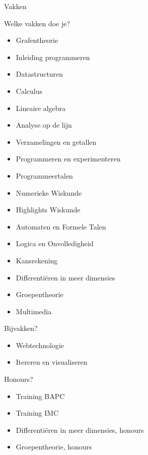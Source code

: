 \documentclass{beamer}
\begin{document}
\begin{frame}{Vakken}
    \begin{multicols}{2}
        Welke vakken doe je?
        \pause
        \begin{itemize}
            \item Grafentheorie
                  \pause
            \item Inleiding programmeren
                  \pause
            \item Datastructuren
                  \pause
            \item Calculus
                  \pause
            \item Lineaire algebra
                  \pause
            \item Analyse op de lijn
                  \pause
            \item Verzamelingen en getallen
                  \pause
            \item Programmeren en experimenteren
                  \pause
            \item Programmeertalen
                  \pause
            \item Numerieke Wiskunde
                  \pause
            \item Highlights Wiskunde
                  \pause
            \item Automaten en Formele Talen
                  \pause
            \item Logica en Onvolledigheid
                  \pause
            \item Kansrekening
                  \pause
            \item Differentiëren in meer dimensies
                  \pause
            \item Groepentheorie
                  \pause
            \item Multimedia
        \end{itemize}
        \pause
        Bijvakken?
        \pause
        \begin{itemize}
            \item Webtechnologie
                  \pause
            \item Itereren en visualiseren
        \end{itemize}
        \pause
        Honours?
        \begin{itemize}
            \pause
            \item Training BAPC
                  \pause
            \item Training IMC
                  \pause
            \item Differentiëren in meer dimensies, honours
                  \pause
            \item Groepentheorie, honours
        \end{itemize}
    \end{multicols}
\end{frame}
\end{document}
